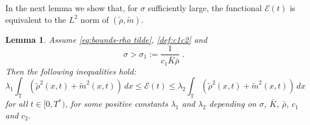 \documentclass[10pt,reqno]{amsart}
\newtheorem{lemma}{Lemma}[section]
\newcommand{\bbt} {\mathbb T}
\begin{document}
In the next lemma we show that, for $\sigma$ sufficiently large, the functional $ \mathcal{E}(t)$ is equivalent to the $L^2$ norm of $(\tilde\rho,\tilde m)$. 

\begin{lemma} \label{S3:lemma1} Assume \eqref{eq:bounds-rho tilde}, \eqref{def:c1c2} and
\begin{equation}\label{bound-on-sigma_1}
\sigma> \sigma_1:=\frac{1}{c_1\bar K\bar\rho}    \;.
\end{equation} 
Then the following inequalities hold: %
    \begin{equation}\label{eq:E-equiv-L2}
        \lambda_1\int_\bbt (\tilde\rho^2(x,t)+\tilde m^2(x,t) )\,dx 
\le \mathcal{E}(t)\le
\lambda_2\int_\bbt (\tilde\rho^2(x,t)+\tilde m^2(x,t))\,dx
    \end{equation}
for all $t\in[0,T^*)$, for some positive constants $\lambda_1$ and $\lambda_2$ depending on $\sigma$, $\bar K$, $\bar\rho$, $c_1$ and $c_2$.
\end{lemma}
\end{document}
